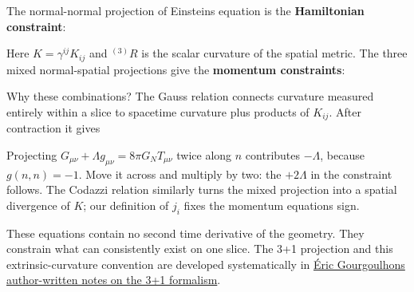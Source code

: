\documentclass[
  11pt,
  letterpaper,
  oneside,
  openany]{scrbook}
\begin{document}
The normal-normal projection of Einstein\textquotesingle s equation is
the \textbf{Hamiltonian constraint}:

\begin{center}
\begingroup
{}
\ifdim\wd\grmathbox>\linewidth
\resizebox{\linewidth}{!}{\usebox{\grmathbox}}
\else\usebox{\grmathbox}\fi
\endgroup
\end{center}

Here \(K=\gamma^{ij}K_{ij}\) and \({}^{(3)}R\) is the scalar curvature
of the spatial metric. The three mixed normal-spatial projections give
the \textbf{momentum constraints}:

\begin{center}
\begingroup
{}
\ifdim\wd\grmathbox>\linewidth
\resizebox{\linewidth}{!}{\usebox{\grmathbox}}
\else\usebox{\grmathbox}\fi
\endgroup
\end{center}

Why these combinations? The Gauss relation connects curvature measured
entirely within a slice to spacetime curvature plus products of
\(K_{ij}\). After contraction it gives

\begin{center}
\begingroup
{}
\ifdim\wd\grmathbox>\linewidth
\resizebox{\linewidth}{!}{\usebox{\grmathbox}}
\else\usebox{\grmathbox}\fi
\endgroup
\end{center}

Projecting \(G_{\mu\nu}+\Lambda g_{\mu\nu}=8\pi G_NT_{\mu\nu}\) twice
along \(n\) contributes \(-\Lambda\), because \(g(n,n)=-1\). Move it
across and multiply by two: the \(+2\Lambda\) in the constraint follows.
The Codazzi relation similarly turns the mixed projection into a spatial
divergence of \(K\); our definition of \(j_i\) fixes the momentum
equation\textquotesingle s sign.

These equations contain no second time derivative of the geometry. They
constrain what can consistently exist on one slice. The 3+1 projection
and this extrinsic-curvature convention are developed systematically in
\href{https://arxiv.org/abs/gr-qc/0703035}{Éric
Gourgoulhon\textquotesingle s author-written notes on the 3+1
formalism}.
\end{document}
